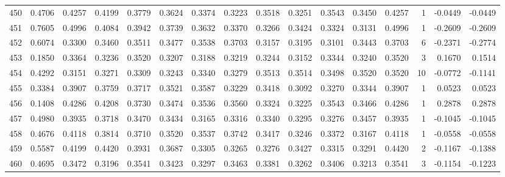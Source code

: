 \begin{tabular}{lrrrrrrrrrrrrrrr}
450 &      0.4706 &  0.4257 &  0.4199 &  0.3779 &  0.3624 &  0.3374 &  0.3223 &  0.3518 &  0.3251 &  0.3543 &   0.3450 &     0.4257 &      1 &                   -0.0449 &                    -0.0449 \\
451 &      0.7605 &  0.4996 &  0.4084 &  0.3942 &  0.3739 &  0.3632 &  0.3370 &  0.3266 &  0.3424 &  0.3324 &   0.3131 &     0.4996 &      1 &                   -0.2609 &                    -0.2609 \\
452 &      0.6074 &  0.3300 &  0.3460 &  0.3511 &  0.3477 &  0.3538 &  0.3703 &  0.3157 &  0.3195 &  0.3101 &   0.3443 &     0.3703 &      6 &                   -0.2371 &                    -0.2774 \\
453 &      0.1850 &  0.3364 &  0.3236 &  0.3520 &  0.3207 &  0.3188 &  0.3219 &  0.3244 &  0.3152 &  0.3344 &   0.3240 &     0.3520 &      3 &                    0.1670 &                     0.1514 \\
454 &      0.4292 &  0.3151 &  0.3271 &  0.3309 &  0.3243 &  0.3340 &  0.3279 &  0.3513 &  0.3514 &  0.3498 &   0.3520 &     0.3520 &     10 &                   -0.0772 &                    -0.1141 \\
455 &      0.3384 &  0.3907 &  0.3759 &  0.3717 &  0.3521 &  0.3587 &  0.3229 &  0.3418 &  0.3092 &  0.3270 &   0.3344 &     0.3907 &      1 &                    0.0523 &                     0.0523 \\
456 &      0.1408 &  0.4286 &  0.4208 &  0.3730 &  0.3474 &  0.3536 &  0.3560 &  0.3324 &  0.3225 &  0.3543 &   0.3466 &     0.4286 &      1 &                    0.2878 &                     0.2878 \\
457 &      0.4980 &  0.3935 &  0.3718 &  0.3470 &  0.3434 &  0.3165 &  0.3316 &  0.3340 &  0.3295 &  0.3276 &   0.3457 &     0.3935 &      1 &                   -0.1045 &                    -0.1045 \\
458 &      0.4676 &  0.4118 &  0.3814 &  0.3710 &  0.3520 &  0.3537 &  0.3742 &  0.3417 &  0.3246 &  0.3372 &   0.3167 &     0.4118 &      1 &                   -0.0558 &                    -0.0558 \\
459 &      0.5587 &  0.4199 &  0.4420 &  0.3931 &  0.3687 &  0.3305 &  0.3265 &  0.3276 &  0.3427 &  0.3315 &   0.3291 &     0.4420 &      2 &                   -0.1167 &                    -0.1388 \\
460 &      0.4695 &  0.3472 &  0.3196 &  0.3541 &  0.3423 &  0.3297 &  0.3463 &  0.3381 &  0.3262 &  0.3406 &   0.3213 &     0.3541 &      3 &                   -0.1154 &                    -0.1223 \\

\end{tabular}
